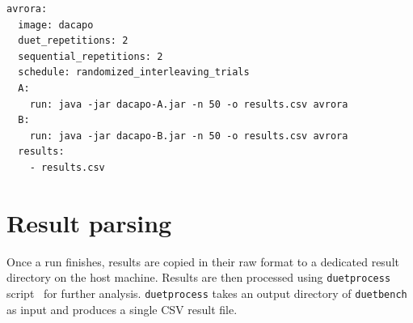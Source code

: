 \begin{listing}
    \begin{lstlisting}
avrora:
  image: dacapo
  duet_repetitions: 2
  sequential_repetitions: 2
  schedule: randomized_interleaving_trials
  A:
    run: java -jar dacapo-A.jar -n 50 -o results.csv avrora
  B:
    run: java -jar dacapo-B.jar -n 50 -o results.csv avrora
  results:
    - results.csv
    \end{lstlisting}
    \caption{
        Example part of YAML configuration file for \lstinline{duetbench} that runs \lstinline{avrora} benchmark from the DaCapo suite.
        In this case, both A and B versions are packaged in a single container image as Java JAR archives.
        Run command specifies how to invoke the DaCapo harness --- 50 iterations, results in \lstinline{results.csv} and run only \lstinline{avrora} benchmark.
        All the result files or directories need to be specified in \lstinline{results} array field.
        Note the correspondence between user input fields from this configuration and parameters in angled brackets from~\cref{fig:duetbench_sequence}.
        Furthermore, users can specify the number of repetitions for both asynchronous duet and sequential measurements, as well as the scheduling strategy for those runs.
    }
    \label{lst:config}
\end{listing}

\section{Result parsing}
\label{sec:result_parsing}

Once a run finishes, results are copied in their raw format to a dedicated result directory on the host machine.
Results are then processed using \lstinline{duetprocess} script~\cite{wiki} for further analysis.
\lstinline{duetprocess} takes an output directory of \lstinline{duetbench} as input and produces a single CSV result file.

